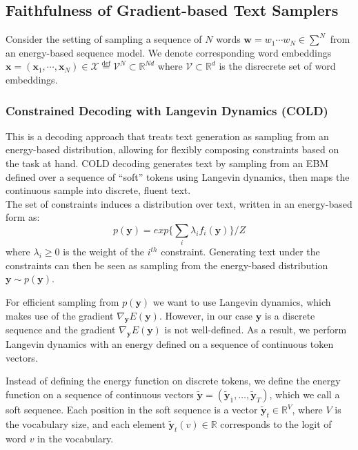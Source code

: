 \documentclass{article}
\newcommand*{\defeq}{\stackrel{\text{def}}{=}}
\begin{document}
\subsection{Faithfulness of Gradient-based Text Samplers}
Consider the setting of sampling a sequence of $N$ words $\boldsymbol{w} = w_1 \cdots w_N \in \sum^{N}$ from an energy-based sequence model. We denote corresponding word embeddings $\boldsymbol{x} = (\boldsymbol{x}_1, \cdots, \boldsymbol{x}_N) \in \mathcal{X} \defeq \mathcal{V}^N \subset \mathbb{R}^{Nd}$ where $\mathcal{V} \subset \mathbb{R}^d$ is the disrecrete set of word embeddings.

\subsubsection{Constrained Decoding with Langevin Dynamics (COLD)} \cite[text]{cold}
This is a decoding approach that treats text generation as sampling from an energy-based distribution, allowing for flexibly composing constraints
based on the task at hand. COLD decoding generates text by sampling from an EBM defined over a
sequence of “soft” tokens using Langevin dynamics, then maps the continuous sample into discrete,
fluent text. \\
The set of constraints induces a distribution over text, written in an energy-based form as:
$$p(\boldsymbol{y}) = exp\{\sum_i \lambda_i f_i(\boldsymbol{y})\}/Z$$
where $\lambda_i \geq 0$ is the weight of the $i^{th}$ constraint. Generating text under the constraints can then be
seen as sampling from the energy-based distribution $\boldsymbol{y} \sim p(\boldsymbol{y})$.

For efficient sampling from $p(\boldsymbol{y})$ we want to use Langevin dynamics, which
makes use of the gradient $\nabla_{\boldsymbol{y}} E(\boldsymbol{y})$. However, in our case $\boldsymbol{y}$ is a discrete sequence and the gradient
$\nabla_{\boldsymbol{y}} E(\boldsymbol{y})$ is not well-defined. As a result, we perform Langevin dynamics with an energy defined on
a sequence of continuous token vectors.

Instead of defining the energy function on discrete tokens, we define the energy function on a sequence of continuous vectors $\tilde{\boldsymbol{y}} = (\tilde{\boldsymbol{y}}_1, \ldots, \tilde{\boldsymbol{y}}_T)$, which we call a soft sequence. Each position in the soft sequence is a vector $\tilde{\boldsymbol{y}}_t \in \mathbb{R}^V$, where $V$ is the vocabulary size, and each element $\tilde{\boldsymbol{y}}_t(v) \in \mathbb{R}$ corresponds to the logit of word $v$ in the vocabulary. 
\end{document}

